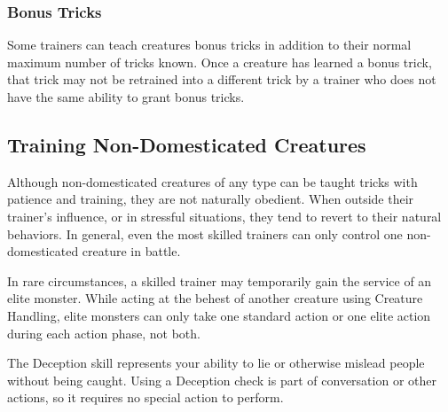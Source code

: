     \subsubsection{Bonus Tricks}\label{Bonus Tricks}
      Some trainers can teach creatures bonus tricks in addition to their normal maximum number of tricks known.
      Once a creature has learned a bonus trick, that trick may not be retrained into a different trick by a trainer who does not have the same ability to grant bonus tricks.

  \subsection{Training Non-Domesticated Creatures}
    Although non-domesticated creatures of any type can be taught tricks with patience and training, they are not naturally obedient.
    When outside their trainer's influence, or in stressful situations, they tend to revert to their natural behaviors.
    In general, even the most skilled trainers can only control one non-domesticated creature in battle.

    In rare circumstances, a skilled trainer may temporarily gain the service of an elite monster.
    While acting at the behest of another creature using Creature Handling, elite monsters can only take one standard action or one elite action during each action phase, not both.

\newpage
{}
  The Deception skill represents your ability to lie or otherwise mislead people without being caught.
  Using a Deception check is part of conversation or other actions, so it requires no special action to perform.

